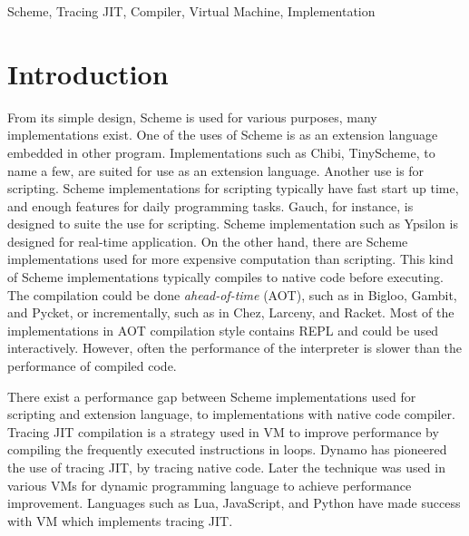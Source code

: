 \documentclass[preprint, numbers]{sigplanconf}
\begin{document}


\keywords
Scheme, Tracing JIT, Compiler, Virtual Machine, Implementation

\section{Introduction}

From its simple design, Scheme is used for various purposes, many
implementations exist. One of the uses of Scheme is as an extension language
embedded in other program. Implementations such as Chibi\cite{shinn2011chibi},
TinyScheme\cite{souflis2012tinyscheme}, to name a few, are suited for use as
an extension language. Another use is for scripting. Scheme implementations
for scripting typically have fast start up time, and enough features for daily
programming tasks. Gauch\cite{kawai2001gauche}, for instance, is designed to
suite the use for scripting. Scheme implementation such as
Ypsilon\cite{fujita2008ypsilon} is designed for real-time application. On the
other hand, there are Scheme implementations used for more expensive
computation than scripting. This kind of Scheme implementations typically
compiles to native code before executing. The compilation could be done
\textit{ahead-of-time} (AOT), such as in Bigloo\cite{serrano1995bigloo},
Gambit\cite{feeleygambit}, and Pycket\cite{bauman2015pycket}, or
incrementally, such as in Chez\cite{dybvigchez}, Larceny\cite{hansenlarceny},
and Racket\cite{racketlang}.  Most of the implementations in AOT compilation
style contains REPL and could be used interactively. However, often the
performance of the interpreter is slower than the performance of compiled
code.

There exist a performance gap between Scheme implementations used for
scripting and extension language, to implementations with native code
compiler. Tracing JIT compilation is a strategy used in VM to improve
performance by compiling the frequently executed instructions in
loops. Dynamo\cite{bala2000dynamo} has pioneered the use of tracing JIT, by
tracing native code. Later the technique was used in various VMs for dynamic
programming language to achieve performance improvement. Languages such as
Lua\cite{pall2008luajit}, JavaScript\cite{gal2009trace}, and
Python\cite{bolz2009tracing} have made success with VM which implements
tracing JIT.\@
\end{document}
